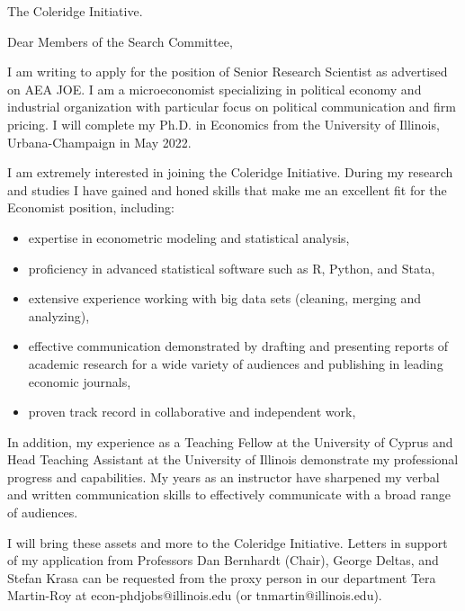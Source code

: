\documentclass[12pt]{letter}
\begin{document}
\date{}
\begin{letter}{The Coleridge Initiative.}

\opening{Dear Members of the Search Committee,}

I am writing to apply for the position of Senior Research Scientist as advertised on AEA JOE.
I am a microeconomist specializing in political economy and industrial organization with particular focus on political communication and firm pricing.
I will complete my Ph.D. in Economics from the University of Illinois, Urbana-Champaign in May 2022. 

I am extremely interested in joining the Coleridge Initiative.
During my research and studies I have gained and honed skills that make me an excellent fit for the Economist position, including:

\begin{itemize}
    \item expertise in econometric modeling and statistical analysis,
    \item proficiency in advanced statistical software such as R, Python, and Stata,
    \item extensive experience working with big data sets (cleaning, merging and analyzing),
    \item effective communication demonstrated by drafting and presenting reports of academic research for a wide variety of audiences and publishing in leading economic journals,
    \item proven track record in collaborative and independent work,
\end{itemize}

In addition, my experience as a Teaching Fellow at the University of Cyprus and Head Teaching Assistant at the University of Illinois demonstrate my professional progress and capabilities.
My years as an instructor have sharpened my verbal and written communication skills to effectively communicate with a broad range of audiences.

I will bring these assets and more to the Coleridge Initiative.
Letters in support of my application from Professors Dan Bernhardt (Chair), George Deltas, and Stefan Krasa can be requested from the proxy person in our department Tera Martin-Roy at econ-phdjobs@illinois.edu (or tnmartin@illinois.edu).


\end{letter}
\end{document}
